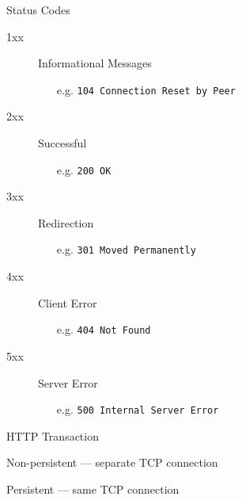 \begin{frame}{Status Codes}
  \begin{description}
  \item[1xx] Informational Messages
    \begin{itemize}
    \item[e.g.] \texttt{104 Connection Reset by Peer}
    \end{itemize}
  \item[2xx] Successful
    \begin{itemize}
    \item[e.g.] \texttt{200 OK}
    \end{itemize}
  \item[3xx] Redirection
    \begin{itemize}
    \item[e.g.] \texttt{301 Moved Permanently}
    \end{itemize}
  \item[4xx] Client Error
    \begin{itemize}
    \item[e.g.] \texttt{404 Not Found}
    \end{itemize}
  \item[5xx] Server Error
    \begin{itemize}
    \item[e.g.] \texttt{500 Internal Server Error}
    \end{itemize}
  \end{description}
\end{frame}

\begin{frame}{HTTP Transaction}
  \begin{iblock}{Non-persistent --- separate TCP connection}
    \begin{center}
       
    \end{center}
  \end{iblock}
\end{frame}

\begin{frame}
  \begin{iblock}{Persistent --- same TCP connection}
    \begin{center}
       
    \end{center}
  \end{iblock}
\end{frame}

